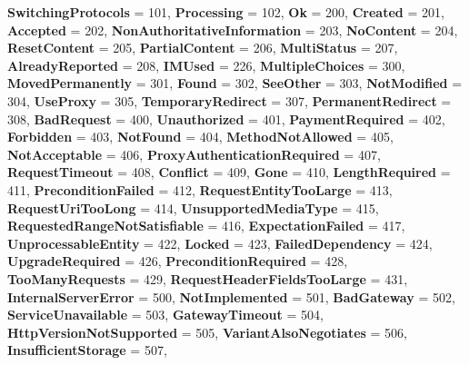 \begin{DoxyCompactItemize}
{\bfseries Switching\+Protocols} = 101, 
{\bfseries Processing} = 102, 
\newline
{\bfseries Ok} = 200, 
{\bfseries Created} = 201, 
{\bfseries Accepted} = 202, 
{\bfseries Non\+Authoritative\+Information} = 203, 
\newline
{\bfseries No\+Content} = 204, 
{\bfseries Reset\+Content} = 205, 
{\bfseries Partial\+Content} = 206, 
{\bfseries Multi\+Status} = 207, 
\newline
{\bfseries Already\+Reported} = 208, 
{\bfseries I\+M\+Used} = 226, 
{\bfseries Multiple\+Choices} = 300, 
{\bfseries Moved\+Permanently} = 301, 
\newline
{\bfseries Found} = 302, 
{\bfseries See\+Other} = 303, 
{\bfseries Not\+Modified} = 304, 
{\bfseries Use\+Proxy} = 305, 
\newline
{\bfseries Temporary\+Redirect} = 307, 
{\bfseries Permanent\+Redirect} = 308, 
{\bfseries Bad\+Request} = 400, 
{\bfseries Unauthorized} = 401, 
\newline
{\bfseries Payment\+Required} = 402, 
{\bfseries Forbidden} = 403, 
{\bfseries Not\+Found} = 404, 
{\bfseries Method\+Not\+Allowed} = 405, 
\newline
{\bfseries Not\+Acceptable} = 406, 
{\bfseries Proxy\+Authentication\+Required} = 407, 
{\bfseries Request\+Timeout} = 408, 
{\bfseries Conflict} = 409, 
\newline
{\bfseries Gone} = 410, 
{\bfseries Length\+Required} = 411, 
{\bfseries Precondition\+Failed} = 412, 
{\bfseries Request\+Entity\+Too\+Large} = 413, 
\newline
{\bfseries Request\+Uri\+Too\+Long} = 414, 
{\bfseries Unsupported\+Media\+Type} = 415, 
{\bfseries Requested\+Range\+Not\+Satisfiable} = 416, 
{\bfseries Expectation\+Failed} = 417, 
\newline
{\bfseries Unprocessable\+Entity} = 422, 
{\bfseries Locked} = 423, 
{\bfseries Failed\+Dependency} = 424, 
{\bfseries Upgrade\+Required} = 426, 
\newline
{\bfseries Precondition\+Required} = 428, 
{\bfseries Too\+Many\+Requests} = 429, 
{\bfseries Request\+Header\+Fields\+Too\+Large} = 431, 
{\bfseries Internal\+Server\+Error} = 500, 
\newline
{\bfseries Not\+Implemented} = 501, 
{\bfseries Bad\+Gateway} = 502, 
{\bfseries Service\+Unavailable} = 503, 
{\bfseries Gateway\+Timeout} = 504, 
\newline
{\bfseries Http\+Version\+Not\+Supported} = 505, 
{\bfseries Variant\+Also\+Negotiates} = 506, 
{\bfseries Insufficient\+Storage} = 507, 

\end{DoxyCompactItemize}
